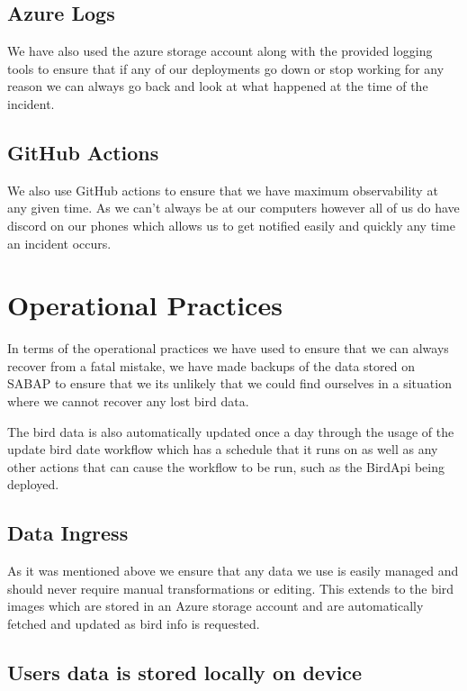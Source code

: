 \documentclass[a4paper]{article}
\begin{document}
\subsection{Azure Logs}

We have also used the azure storage account along with the provided logging tools to ensure that 
if any of our deployments go down or stop working for any reason we can always go back and 
look at what happened at the time of the incident.

\subsection{GitHub Actions}
We also use GitHub actions to ensure that we have maximum observability at any given time. As 
we can't always be at our computers however all of us do have discord on our phones which 
allows us to get notified easily and quickly any time an incident occurs.

\newpage
\section{Operational Practices}

In terms of the operational practices we have used to ensure that we can always recover from 
a fatal mistake, we have made backups of the data stored on SABAP to ensure that we its 
unlikely that we could find ourselves in a situation where we cannot recover any lost bird data. 
\newline \newline

The bird data is also automatically updated once a day through the usage of the update bird 
date workflow which has a schedule that it runs on as well as any other actions that can 
cause the workflow to be run, such as the BirdApi being deployed.

\subsection{Data Ingress}

As it was mentioned above we ensure that any data we use is easily managed and should never require 
manual transformations or editing. This extends to the bird images which are stored in an Azure 
storage account and are automatically fetched and updated as bird info is requested.

\subsection{Users data is stored locally on device}
\end{document}
